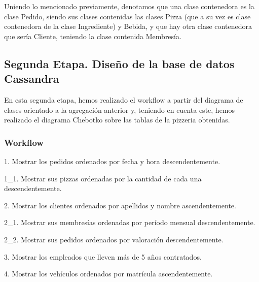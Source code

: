 \documentclass[a4paper]{article}
\begin{document}
\vspace{1.5mm} Uniendo lo mencionado previamente, denotamos que una clase contenedora es la clase Pedido, siendo sus clases contenidas las clases Pizza (que a su vez es clase contenedora de la clase Ingrediente) y Bebida, y que hay otra clase contenedora que sería Cliente, teniendo la clase contenida Membresía.

\newpage

\subsection{\huge{Segunda Etapa. Diseño de la base de datos Cassandra}}

\vspace{1.5mm} En esta segunda etapa, hemos realizado el workflow a partir del diagrama de clases orientado a la agregación anterior y, teniendo en cuenta este, hemos realizado el diagrama Chebotko sobre las tablas de la pizzeria obtenidas.

\subsubsection{\Large{Workflow}} \label{Workflow}

\vspace{1.5mm}1. Mostrar los pedidos ordenados por fecha y hora descendentemente.

\vspace{1.5mm}

\hspace{4mm}1\_1. Mostrar sus pizzas ordenadas por la cantidad de cada una descendentemente.

\vspace{1.5mm}2. Mostrar los clientes ordenados por apellidos y nombre ascendentemente.

\vspace{1.5mm}

\hspace{4mm}2\_1. Mostrar sus membresías ordenadas por período mensual descendentemente.

\vspace{1.5mm}

\hspace{4mm}2\_2. Mostrar sus pedidos ordenados por valoración descendentemente.

\vspace{1.5mm}3. Mostrar los empleados que lleven más de 5 años contratados.

\vspace{1.5mm}4. Mostrar los vehículos ordenados por matrícula ascendentemente.
\end{document}
